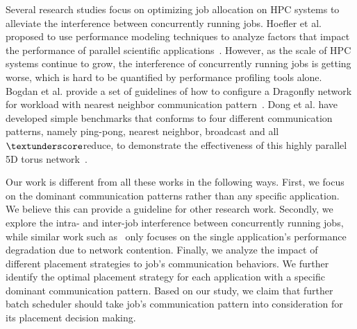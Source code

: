 Several research studies focus on optimizing job allocation on HPC systems 
to alleviate the interference between concurrently running jobs. 
Hoefler et al. proposed to use performance modeling techniques to analyze factors that 
impact the performance of parallel scientific applications~\cite{hoefler-modeling}. 
However, as the scale of HPC systems continue to grow, 
the interference of concurrently running jobs is getting worse, 
which is hard to be quantified by performance profiling tools alone. 
Bogdan et al. provide a set of guidelines of how to configure a Dragonfly network 
for workload with nearest neighbor communication pattern~\cite{Bogdan-hpdc14}. 
Dong et al. have developed simple benchmarks that conforms to four different communication patterns, 
namely ping-pong, nearest neighbor, broadcast and all$\textunderscore$reduce, 
to demonstrate the effectiveness of this highly parallel 5D torus network~\cite{Dong-SC11}.

Our work is different from all these works in the following ways. 
First, we focus on the dominant communication patterns rather than any specific application. 
We believe this can provide a guideline for other research work. 
Secondly, we explore the intra- and inter-job interference between concurrently running jobs, 
while similar work such as~\cite{abhinav-sc13} only focuses 
on the single application's performance degradation due to network contention. 
Finally, we analyze the impact of different placement strategies to job's communication behaviors. 
We further identify the optimal placement strategy for 
each application with a specific dominant communication pattern. 
Based on our study, we claim that further batch scheduler should take 
job's communication pattern into consideration for its placement decision making. 

